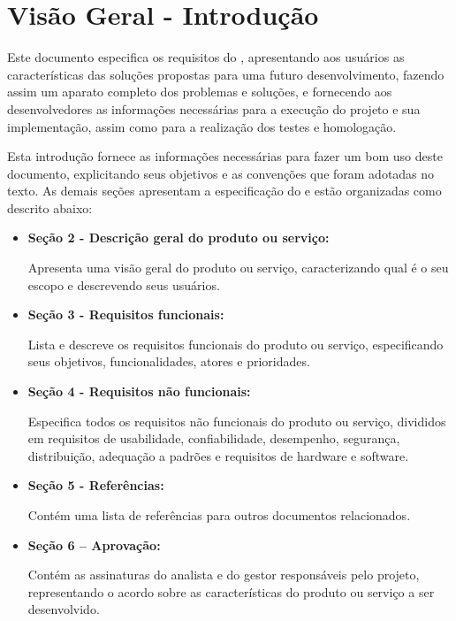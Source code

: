 \section{Visão Geral - Introdução}
\hspace{2.0cm}

Este documento especifica os requisitos do \textbf{\myProject},
apresentando aos usuários as características das soluções
propostas para uma futuro desenvolvimento, fazendo assim
um aparato completo dos problemas e soluções, e fornecendo
aos desenvolvedores as informações necessárias para a execução
do projeto e sua implementação, assim como para a realização
dos testes e homologação.


Esta introdução fornece as informações necessárias para fazer
um bom uso deste documento, explicitando seus objetivos e as
convenções que foram adotadas no texto. As demais seções
apresentam a especificação do \textbf{\myProject} e estão 
organizadas como descrito abaixo:

\begin{itemize}
  \item \textbf{Seção 2 - Descrição geral do produto ou serviço:}

    Apresenta uma visão geral do produto ou serviço, 
    caracterizando qual é o seu escopo e descrevendo seus usuários.

  \item \textbf{Seção 3 - Requisitos funcionais:}

    Lista e descreve os requisitos funcionais do produto ou serviço, 
    especificando seus objetivos, funcionalidades, atores e prioridades.

  \item \textbf{Seção 4 - Requisitos não funcionais:}

    Especifica todos os requisitos não funcionais do produto ou serviço, 
    divididos em requisitos de usabilidade, confiabilidade, desempenho, 
    segurança, distribuição, adequação a padrões e requisitos de hardware 
    e software.

  \item \textbf{Seção 5 - Referências:}

    Contém uma lista de referências para outros documentos relacionados.

  \item \textbf{Seção 6 – Aprovação:}

    Contém as assinaturas do analista e do gestor responsáveis pelo projeto, 
    representando o acordo sobre as características do produto ou serviço 
    a ser desenvolvido.

\end{itemize}

